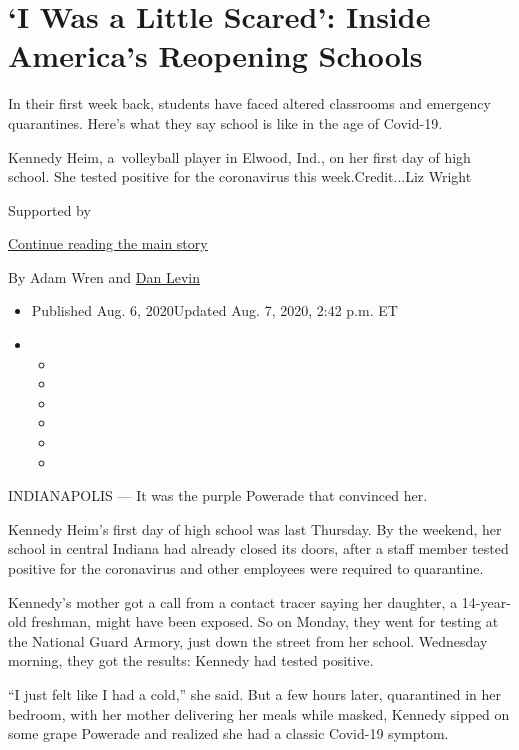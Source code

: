 \hypertarget{i-was-a-little-scared-inside-americas-reopening-schools}{%
\section{`I Was a Little Scared': Inside America's Reopening
Schools}\label{i-was-a-little-scared-inside-americas-reopening-schools}}

In their first week back, students have faced altered classrooms and
emergency quarantines. Here's what they say school is like in the age of
Covid-19.

Kennedy Heim, a~volleyball player in Elwood, Ind., on her first day of
high school. She tested positive for the coronavirus this
week.Credit...Liz Wright

Supported by

\protect\hyperlink{after-sponsor}{Continue reading the main story}

By Adam Wren and
\href{https://www.nytimes3xbfgragh.onion/by/dan-levin}{Dan Levin}

\begin{itemize}
\item
  Published Aug. 6, 2020Updated Aug. 7, 2020, 2:42 p.m. ET
\item
  \begin{itemize}
  \item
  \item
  \item
  \item
  \item
  \item
  \end{itemize}
\end{itemize}

INDIANAPOLIS --- It was the purple Powerade that convinced her.

Kennedy Heim's first day of high school was last Thursday. By the
weekend, her school in central Indiana had already closed its doors,
after a staff member tested positive for the coronavirus and other
employees were required to quarantine.

Kennedy's mother got a call from a contact tracer saying her daughter, a
14-year-old freshman, might have been exposed. So on Monday, they went
for testing at the National Guard Armory, just down the street from her
school. Wednesday morning, they got the results: Kennedy had tested
positive.

``I just felt like I had a cold,'' she said. But a few hours later,
quarantined in her bedroom, with her mother delivering her meals while
masked, Kennedy sipped on some grape Powerade and realized she had a
classic Covid-19 symptom.

